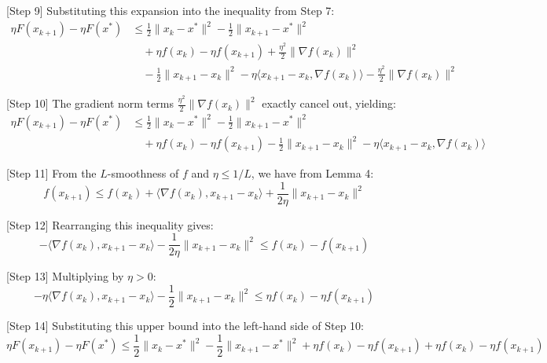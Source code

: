 \documentclass{article}
\begin{document}
[Step 9] Substituting this expansion into the inequality from Step 7:
\begin{align}
\eta F(x_{k+1}) - \eta F(x^*) &\leq \frac{1}{2}\|x_k - x^*\|^2 - \frac{1}{2}\|x_{k+1} - x^*\|^2 \\
&\quad + \eta f(x_k) - \eta f(x_{k+1}) + \frac{\eta^2}{2} \|\nabla f(x_k)\|^2 \\
&\quad - \frac{1}{2}\|x_{k+1} - x_k\|^2 - \eta \langle x_{k+1} - x_k, \nabla f(x_k) \rangle - \frac{\eta^2}{2} \|\nabla f(x_k)\|^2
\end{align}

[Step 10] The gradient norm terms $\frac{\eta^2}{2} \|\nabla f(x_k)\|^2$ exactly cancel out, yielding:
\begin{align}
\eta F(x_{k+1}) - \eta F(x^*) &\leq \frac{1}{2}\|x_k - x^*\|^2 - \frac{1}{2}\|x_{k+1} - x^*\|^2 \\
&\quad + \eta f(x_k) - \eta f(x_{k+1}) - \frac{1}{2}\|x_{k+1} - x_k\|^2 - \eta \langle x_{k+1} - x_k, \nabla f(x_k) \rangle
\end{align}

[Step 11] From the $L$-smoothness of $f$ and $\eta \leq 1/L$, we have from Lemma 4:
\begin{equation}
f(x_{k+1}) \leq f(x_k) + \langle \nabla f(x_k), x_{k+1} - x_k \rangle + \frac{1}{2\eta} \|x_{k+1} - x_k\|^2
\end{equation}

[Step 12] Rearranging this inequality gives:
\begin{equation}
- \langle \nabla f(x_k), x_{k+1} - x_k \rangle - \frac{1}{2\eta} \|x_{k+1} - x_k\|^2 \leq f(x_k) - f(x_{k+1})
\end{equation}

[Step 13] Multiplying by $\eta > 0$:
\begin{equation}
- \eta \langle \nabla f(x_k), x_{k+1} - x_k \rangle - \frac{1}{2} \|x_{k+1} - x_k\|^2 \leq \eta f(x_k) - \eta f(x_{k+1})
\end{equation}

[Step 14] Substituting this upper bound into the left-hand side of Step 10:
\begin{equation}
\eta F(x_{k+1}) - \eta F(x^*) \leq \frac{1}{2}\|x_k - x^*\|^2 - \frac{1}{2}\|x_{k+1} - x^*\|^2 + \eta f(x_k) - \eta f(x_{k+1}) + \eta f(x_k) - \eta f(x_{k+1})
\end{equation}
\end{document}
